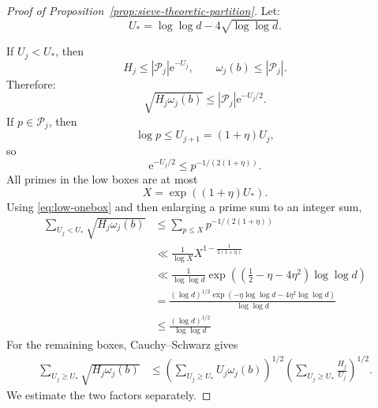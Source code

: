 \documentclass[11pt]{amsart}
\theoremstyle{remark}
\begin{document}
\begin{proof}[Proof of Proposition~\ref{prop:sieve-theoretic-partition}]
Let:
\begin{equation}
 U_*=\log \log d-4\sqrt{\log \log d}.
\end{equation}

If $U_j<U_*$, then
\[
 H_j\le |\mathcal{P}_j|\mathrm e^{-U_j},
 \qquad \omega_j(b)\le |\mathcal{P}_j|.
\]
Therefore:
\begin{equation}\label{eq:low-onebox}
 \sqrt{H_j\omega_j(b)}\le |\mathcal{P}_j|\mathrm e^{-U_j/2}.
\end{equation}
If $p\in\mathcal P_j$, then
\[
 \log p\le U_{j+1}=(1+\eta)U_j,
\]
so
\[
 \mathrm e^{-U_j/2}\le p^{-1/(2(1+\eta))}.
\]
All primes in the low boxes are at most
\[
 X=\exp((1+\eta)U_*).
\]
Using \eqref{eq:low-onebox} and then enlarging a prime sum to an integer sum,
\begin{align*}
 \sum_{U_j<U_*}\sqrt{H_j\omega_j(b)}
 &\le \sum_{p\le X}p^{-1/(2(1+\eta))}\\
 &\ll \frac{1}{\log X} X^{1-\frac{1}{2(1+\eta)}}\\
 &\ll \frac{1}{\log \log d}
 \exp\!\left(\left(\frac12-\eta-4\eta^2\right)\log\log d\right)\\
 &= \frac{(\log d)^{1/2} \exp(- \eta \log \log d - 4 \eta^2 \log \log d) }{\log \log d} \\
 &\leq \frac{(\log d)^{1/2}}{\log \log d}
\end{align*}
For the remaining boxes, Cauchy--Schwarz gives
\begin{align}
 \sum_{U_j\ge U_*}\sqrt{H_j\omega_j(b)}
 &\le
 \left(\sum_{U_j\ge U_*}U_j\omega_j(b)\right)^{1/2}
 \left(\sum_{U_j\ge U_*}\frac{H_j}{U_j}\right)^{1/2}.
\label{eq:CS-main}
\end{align}
We estimate the two factors separately.


\end{proof}
\end{document}
